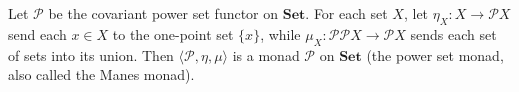 Let $\mathcal{P}$ be the covariant power set functor on $\mathbf{Set}$. For each set $X$, let $\eta_X : X \to \mathcal{P}X$ send each $x \in X$ to the one-point set $\{x\}$, while $\mu_X : \mathcal{P}\mathcal{P}X \to \mathcal{P}X$ sends each set of sets into its union. Then $\langle \mathcal{P}, \eta, \mu \rangle$ is a monad $\mathcal{P}$ on $\mathbf{Set}$ (the power set monad, also called the Manes monad).
